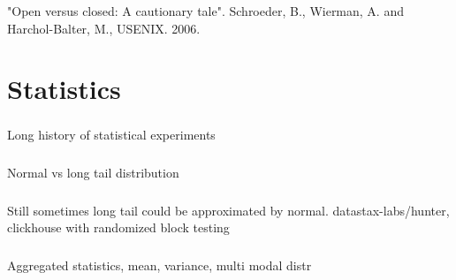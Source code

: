 \documentclass[usenames,dvipsnames, 18pt, compress, aspectratio=169]{beamer}
\begin{document}
\begin{frame}
\begin{center}
\begin{overprint}[10.0cm]
		\end{overprint}
    \end{center}

    \linespread{0.5}
    \vspace{0.5cm}
    \color{black}\fontsize{6pt}{0}\selectfont
        "Open versus closed: A cautionary tale". Schroeder, B., Wierman, A. and
        Harchol-Balter, M., USENIX. 2006.
    \linespread{1.5}
\end{frame}

\section{Statistics}

\begin{frame}
    \frametitle{}
    \begin{center}
        Long history of statistical experiments
    \end{center}
\end{frame}

\begin{frame}
    \frametitle{}
    \begin{center}
        Normal vs long tail distribution
    \end{center}
\end{frame}

\begin{frame}
    \frametitle{}
    \begin{center}
        Still sometimes long tail could be approximated by normal.
        datastax-labs/hunter, clickhouse with randomized block testing
    \end{center}
\end{frame}

\begin{frame}
    \frametitle{}
    \begin{center}
        Aggregated statistics, mean, variance, multi modal distr
    \end{center}
\end{frame}
\end{document}
